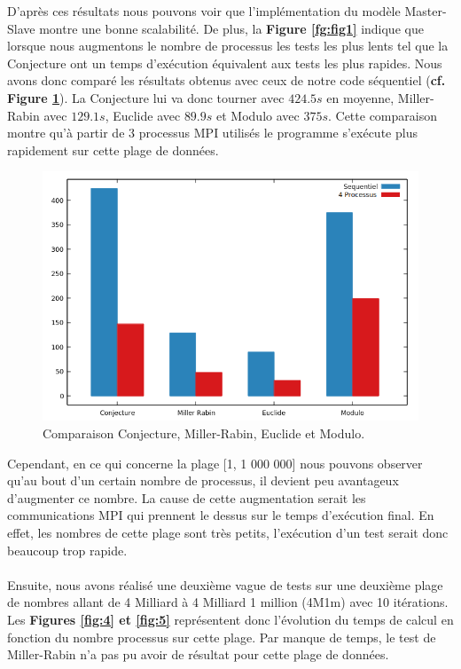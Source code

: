 D'après ces résultats nous pouvons voir que l'implémentation du modèle Master-Slave montre une bonne scalabilité. De plus, la \textbf{Figure \ref{fg:fig1}} indique que lorsque nous augmentons le nombre de processus les tests les plus lents tel que la Conjecture ont un temps d'exécution équivalent aux tests les plus rapides. Nous avons donc comparé les résultats obtenus avec ceux de notre code séquentiel (\textbf{cf. Figure \ref{fg:bar}}). La Conjecture lui va donc tourner avec $424.5s$ en moyenne, Miller-Rabin avec $129.1s$, Euclide avec $89.9s$ et Modulo avec $375s$. Cette comparaison montre qu'à partir de 3 processus MPI utilisés le programme s'exécute plus rapidement sur cette plage de données.
\begin{figure}[!ht]	
		\begin{center}\includegraphics[scale=0.6]{Bar1.png}\end{center}
		\caption{Comparaison Conjecture, Miller-Rabin, Euclide et Modulo. }
		\label{fg:bar}
\end{figure}

Cependant, en ce qui concerne la plage [1, 1 000 000] nous pouvons observer qu'au bout d'un certain nombre de processus, il devient peu avantageux d'augmenter ce nombre. La cause de cette augmentation serait les communications MPI qui prennent le dessus sur le temps d'exécution final. En effet, les nombres de cette plage sont très petits, l'exécution d'un test serait donc beaucoup trop rapide.\\


	\paragraph{}Ensuite, nous avons réalisé une deuxième vague de tests sur une deuxième plage de nombres allant de 4 Milliard à 4 Milliard 1 million (4M1m) avec 10 itérations. Les \textbf{Figures \ref{fig:4} et \ref{fig:5}} représentent donc l'évolution du temps de calcul en fonction du nombre processus sur cette plage. Par manque de temps, le test de Miller-Rabin n'a pas pu avoir de résultat pour cette plage de données.

